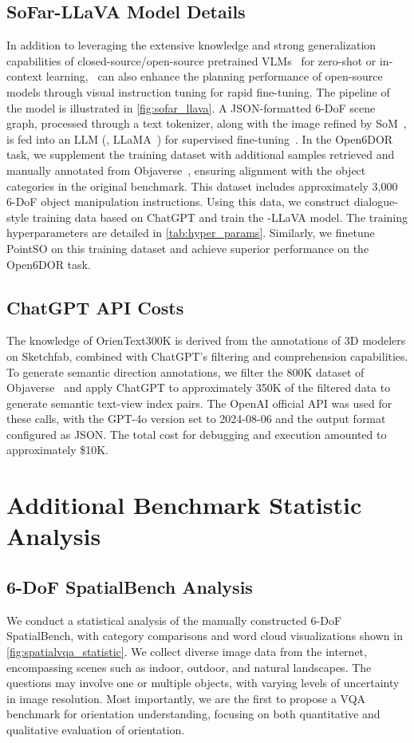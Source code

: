 \subsection{SoFar-LLaVA Model Details}\label{app:model_details}

In addition to leveraging the extensive knowledge and strong generalization capabilities of closed-source/open-source pretrained VLMs~\cite{ChatGPT22,gemini23,qwenvl23} for zero-shot or in-context learning, \sofar~can also enhance the planning performance of open-source models through visual instruction tuning for rapid fine-tuning. The pipeline of the model is illustrated in \cref{fig:sofar_llava}. A JSON-formatted 6-DoF scene graph, processed through a text tokenizer, along with the image refined by SoM~\cite{SoM23}, is fed into an LLM (\eg, LLaMA~\cite{LLaMA23,LLaMA2_23}) for supervised fine-tuning~\cite{LLaVA23}.
In the Open6DOR~\cite{Open6DOR24} task, we supplement the training dataset with additional samples retrieved and manually annotated from Objaverse~\cite{objaverse23}, ensuring alignment with the object categories in the original benchmark. This dataset includes approximately 3,000 6-DoF object manipulation instructions. Using this data, we construct dialogue-style training data based on ChatGPT and train the \sofar-LLaVA model. The training hyperparameters are detailed in \cref{tab:hyper_params}. Similarly, we finetune PointSO on this training dataset and achieve superior performance on the Open6DOR task.

\subsection{ChatGPT API Costs}
The knowledge of OrienText300K is derived from the annotations of 3D modelers on Sketchfab, combined with ChatGPT's filtering and comprehension capabilities. To generate semantic direction annotations, we filter the 800K dataset of Objaverse~\cite{objaverse23} and apply ChatGPT to approximately 350K of the filtered data to generate semantic text-view index pairs. The OpenAI official API was used for these calls, with the GPT-4o version set to 2024-08-06 and the output format configured as JSON. The total cost for debugging and execution amounted to approximately \$10K.


\section{Additional Benchmark Statistic Analysis}
\subsection{6-DoF SpatialBench Analysis}
We conduct a statistical analysis of the manually constructed 6-DoF SpatialBench, with category comparisons and word cloud visualizations shown in \cref{fig:spatialvqa_statistic}. We collect diverse image data from the internet, encompassing scenes such as indoor, outdoor, and natural landscapes. The questions may involve one or multiple objects, with varying levels of uncertainty in image resolution. Most importantly, we are the first to propose a VQA benchmark for orientation understanding, focusing on both quantitative and qualitative evaluation of orientation.


